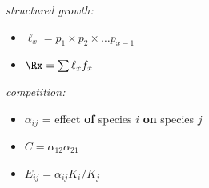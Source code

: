 \textsl{structured growth:}
\begin{itemize}
\item $\ell_x= p_1 \times p_2 \times \ldots p_{x-1}$
\item $\Rx = \sum \ell_x f_x$
\end{itemize}

\textsl{competition:}
\begin{itemize}
\item $\alpha_{ij}$ = effect \textbf{of} species $i$ \textbf{on} species $j$
\item $C = \alpha_{12}\alpha_{21}$
\item $E_{ij} = \alpha_{ij} K_i/K_j$
\end{itemize}
